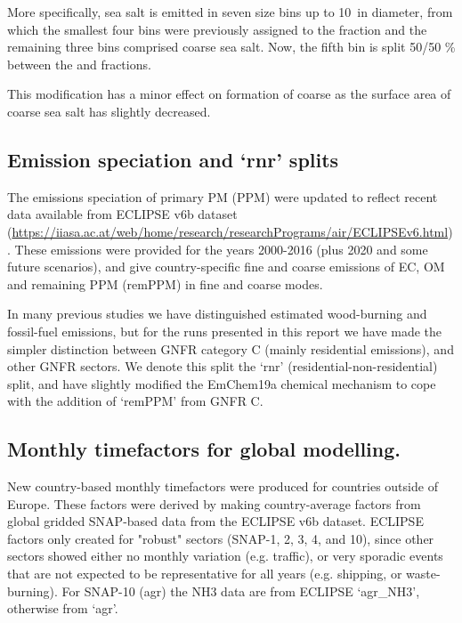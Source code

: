 More specifically, sea salt is emitted in seven size bins up to 10~\um in diameter, from which the smallest four bins were previously assigned to the \PM[2.5] fraction and the remaining three bins comprised coarse sea salt. Now, the fifth bin is split 50/50 \% between the \PM[2.5] and \PM[2.5-10] fractions.  


This modification has a minor effect on formation of coarse  as the surface area of coarse sea salt has slightly decreased.



\subsection{Emission speciation and `rnr' splits}
\label{ssec:emissplits}

The emissions speciation of primary PM (PPM) were updated
to reflect recent data available from
ECLIPSE v6b dataset
(\url{https://iiasa.ac.at/web/home/research/researchPrograms/air/ECLIPSEv6.html}).
These emissions were provided for the years 2000-2016 (plus 2020 and some future
scenarios), and give country-specific fine and coarse emissions of EC, OM and remaining
PPM (remPPM) in fine and coarse modes.

In many previous studies we have distinguished estimated wood-burning and
fossil-fuel emissions, but for the runs presented in this report we
have made the simpler distinction between GNFR category C (mainly
residential emissions), and other GNFR sectors.  We denote this
split the `rnr' (residential-non-residential) split, and have slightly
modified the EmChem19a chemical mechanism to cope with the addition
of `remPPM' from GNFR C.

\subsection{Monthly timefactors for global modelling.}
\label{ssec:monthlyFacs}

New country-based monthly timefactors were produced for countries outside of Europe. These factors were derived by making country-average factors from global gridded SNAP-based data from the ECLIPSE v6b dataset. ECLIPSE factors only created for "robust" sectors (SNAP-1, 2, 3, 4, and 10), since other sectors showed either no monthly variation (e.g. traffic), or very sporadic events that are not expected to be representative for all years (e.g. shipping, or waste-burning). For SNAP-10 (agr) the NH3 data are from ECLIPSE `agr\_NH3', otherwise from `agr'.



